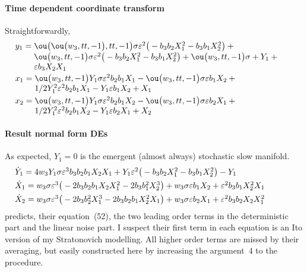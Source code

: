 \paragraph{Time dependent coordinate transform}  Straightforwardly,
\begin{align*}&
y_{1}=\ParMath{\ou\big(\ou\big(w_{3},tt,-1\big),tt,-1\big) \sigma  \eps^{2} \big(
-b_{3} b_{2} X_{1}^{2}-b_{3} b_{1} X_{2}^{2}\big)+\ou\big(w_{3},tt,-1
\big) \sigma  \eps^{2} \big(-b_{3} b_{2} X_{1}^{2}-b_{3} b_{1} X_{2}^{2}
\big)+\ou\big(w_{3},tt,-1\big) \sigma +Y_{1}+\eps b_{3} X_{2} X_{1}
}
\\&
x_{1}=\ParMath{ \ou\big(w_{3},tt,-1\big) Y_{1} \sigma  \eps^{2} b_{2} b_{1} X_{1}-
\ou\big(w_{3},tt,-1\big) \sigma  \eps b_{1} X_{2}+1/2 Y_{1}^{2} \eps^{2}
 b_{2} b_{1} X_{1}-Y_{1} \eps b_{1} X_{2}+X_{1}
}
\\&
x_{2}=\ParMath{ \ou\big(w_{3},tt,-1\big) Y_{1} \sigma  \eps^{2} b_{2} b_{1} X_{2}-
\ou\big(w_{3},tt,-1\big) \sigma  \eps b_{2} X_{1}+1/2 Y_{1}^{2} \eps^{2}
 b_{2} b_{1} X_{2}-Y_{1} \eps b_{2} X_{1}+X_{2}
 }
\end{align*}

\paragraph{Result normal form DEs}
As expected, \(Y_1=0\) is the emergent (almost always) stochastic slow manifold.
\begin{align*}&
\dot Y_{1}=\ParMath{ 4 w_{3} Y_{1} \sigma  \eps^{3} b_{3} b_{2} b_{1} X_{2} X_{1}+
Y_{1} \eps^{2} \big(-b_{3} b_{2} X_{1}^{2}-b_{3} b_{1} X_{2}^{2}\big)-Y_
{1}
}
\\&
\dot X_{1}=\ParMath{ w_{3} \sigma  \eps^{3} \big(-2 b_{3} b_{2} b_{1} X_{2} X_{1}
^{2}-2 b_{3} b_{1}^{2} X_{2}^{3}\big)+w_{3} \sigma  \eps b_{1} X_{2}+
\eps^{2} b_{3} b_{1} X_{2}^{2} X_{1}
}
\\&
\dot X_{2}=\ParMath{ w_{3} \sigma  \eps^{3} \big(-2 b_{3} b_{2}^{2} X_{1}^{3}-2 b_
{3} b_{2} b_{1} X_{2}^{2} X_{1}\big)+w_{3} \sigma  \eps b_{2} X_{1}+\eps
^{2} b_{3} b_{2} X_{2} X_{1}^{2}
}
\end{align*}
\cite{Majda02} predicts, their equation~(52), the two leading order terms in the deterministic part and the linear noise part.
I suspect their first term in each equation is an Ito version of my Stratonovich modelling.
All higher order terms are missed by their averaging, but easily constructed here by increasing the argument~\(4\) to the procedure.




